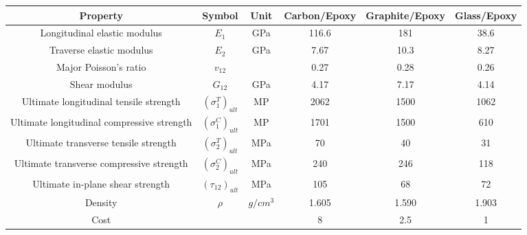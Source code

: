 \documentclass[USenglish]{article}
\begin{document}
\begin{adjustbox}{width={\textwidth},totalheight={\textheight},keepaspectratio}
\begin{tabular}{cccccc}
\toprule
Property								   & Symbol				  & Unit  &  Carbon/Epoxy&  Graphite/Epoxy  &  Glass/Epoxy   \\
\midrule
Longitudinal elastic modulus			   & $E_1$				  & GPa   &  116.6       &  181             &  38.6           \\
Traverse elastic modulus				   & $E_2$				  & GPa   &  7.67        &  10.3            &  8.27           \\
Major Poisson's ratio					   & $v_{12}$			  &       &  0.27        &  0.28            &  0.26           \\
Shear modulus							   & $G_{12}$			  & GPa   &  4.17        &  7.17            &  4.14           \\
Ultimate longitudinal tensile strength     & $(\sigma_1^T)_{ult}$ & MP    &  2062        &  1500            &  1062            \\
Ultimate longitudinal compressive strength & $(\sigma_1^C)_{ult}$ & MP    &  1701        &  1500            &  610             \\
Ultimate transverse tensile strength       & $(\sigma_2^T)_{ult}$ & MPa   &  70          &  40              &  31              \\
Ultimate transverse compressive strength   & $(\sigma_2^C)_{ult}$ & MPa   &  240         &  246             &  118              \\
Ultimate in-plane shear strength           & $(\tau_{12})_{ult}$  & MPa   &  105         &  68              &  72               \\
Density                                    & $\rho$               & $g/cm^3$ &  1.605    &  1.590           &  1.903               \\
Cost                                       &                      &       &  8           &  2.5             &  1               \\
\bottomrule
\end{tabular}
\end{adjustbox}
\label{tab:mat}
\end{document}
